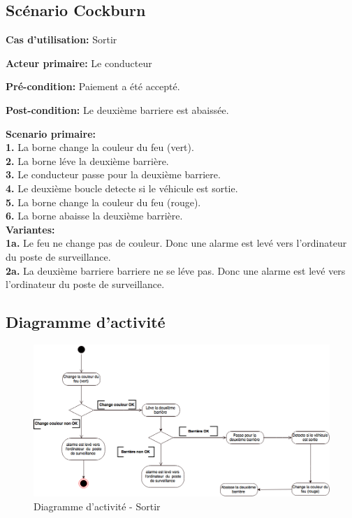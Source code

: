 \subsection{Scénario Cockburn}
\textbf{Cas d'utilisation:} Sortir

\textbf{Acteur primaire:}  Le conducteur

\textbf{Pré-condition:} Paiement a été accepté.
 
\textbf{Post-condition:} Le deuxième barriere est abaissée. 

\textbf{Scenario primaire: } \\
    \textbf{1.} La borne change la couleur du feu (vert). \\
    \textbf{2.} La borne léve la deuxième barrière. \\
    \textbf{3.} Le conducteur passe pour la deuxième barriere. \\
    \textbf{4.} Le deuxième boucle detecte si le véhicule est sortie.\\ 
    \textbf{5.} La borne change la couleur du feu (rouge).\\
    \textbf{6.} La borne abaisse la deuxième barrière. \\

\textbf{Variantes:}\\
    \textbf{1a.} Le feu ne change pas de couleur. Donc une alarme est levé vers  l'ordinateur  du  poste de surveillance. \\
    \textbf{2a.}  La deuxième barriere barriere ne se léve pas. Donc une alarme est levé vers  l'ordinateur du poste de surveillance.
    
\newpage    
\subsection{Diagramme d'activité}
\begin{figure}[!htb]
    \centering
    \includegraphics[scale=0.5, angle = 90]{02_Desenvolvimento/TD2/images/DASortir.png}
    \caption{Diagramme d'activité - Sortir}
    \label{fig:DARentrer}
\end{figure}
\newpage    
